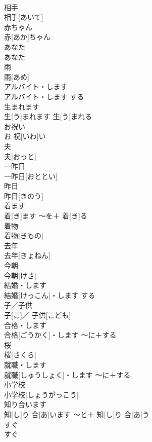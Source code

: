 \documentclass[8pt]{extreport}
\begin{document}
\begin{CJK}{UTF8}{min}
\\	相手	
\\	相手[あいて]		
\\	赤ちゃん	
\\	赤[あか]ちゃん		
\\	あなた	
\\	あなた		
\\	雨	
\\	雨[あめ]		
\\	アルバイト・します	
\\	アルバイト・します	する	
\\	生まれます	
\\	生[う]まれます	生[う]まれる	
\\	お祝い	
\\	お 祝[いわ]い		
\\	夫	
\\	夫[おっと]		
\\	一昨日	
\\	一昨日[おととい]		
\\	昨日	
\\	昨日[きのう]		
\\	着ます	
\\	着[き]ます	〜を＋ 着[き]る	
\\	着物	
\\	着物[きもの]		
\\	去年	
\\	去年[きょねん]		
\\	今朝	
\\	今朝[けさ]		
\\	結婚・します	
\\	結婚[けっこん]・します	する	
\\	子／子供	
\\	子[こ]／ 子供[こども]		
\\	合格・します	
\\	合格[ごうかく]・します	〜に＋する	
\\	桜	
\\	桜[さくら]		
\\	就職・します	
\\	就職[しゅうしょく]・します	〜に＋する	
\\	小学校	
\\	小学校[しょうがっこう]		
\\	知り合います	
\\	知[し]り 合[あ]います	〜と＋ 知[し]り 合[あ]う	
\\	すぐ	
\\	すぐ		

\end{CJK}
\end{document}
